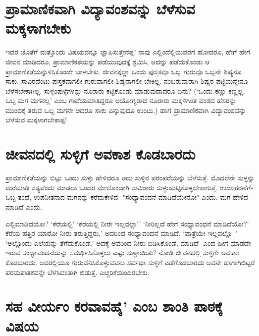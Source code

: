 \section*{ಪ್ರಾಮಾಣಿಕವಾಗಿ ವಿದ್ಯಾವಂಶವನ್ನು ಬೆಳೆಸುವ ಮಕ್ಕಳಾಗಬೇಕು}

ಇದರ ಜೊತೆಗೆ ಮತ್ತೊಂದು ವಿಷಯವನ್ನೂ ಜ್ಞಾಪಿಸುತ್ತೇನೆಪ್ಪ! ನಾವು ಎಲ್ಲಿಂದೆಲ್ಲಿಯವರೆಗೆ ಹೋದರೂ, ಹೇಗೆ ಹೇಗೆ ಜೀವನ ಮಾಡಿದರೂ, ಪ್ರಾಮಾಣಿಕತೆಯನ್ನು ಪಡೆಯುವುದಕ್ಕೆ ಶ್ರಮಿಸಿ, ಅದನ್ನು ಪಡೆದುಕೊಂಡು ಆ ಪ್ರಾಮಾಣಿಕತೆಯನ್ನುಳಿಸಿಕೊಂಡೇ ಬಾಳಬೇಕು. ಜೀವನಕ್ಕೆಲ್ಲಾ ಒಂದು ಪುಸ್ತಕವೂ ಒಬ್ಬ ಗುರುವೂ ಒಬ್ಬನೇ ಶಿಷ್ಯನೂ ಸಾಕು. ಸಾವಿರದೆಂಟು ಪುಸ್ತಕವಾಗಲೀ ಗುರುವಾಗಲೀ ಶಿಷ್ಯನಾಗಲೀ ಬೇಕಿಲ್ಲ. ನಂಬರುವಾರಾಗಿ ಶಿಷ್ಯರ ಪಟ್ಟಿಯನ್ನೇನೂ ಬೆಳೆಸಬೇಕಾಗಿಲ್ಲ. ಸುಳ್ಳಂಪುಳ್ಳೆಗಳನ್ನು ನೂರಾರು ಕಟ್ಟಿಕೊಂಡು ಮಾಡುವುದಾದರೂ ಏನು? (`ಒಂದು ಕಣ್ಣು ಕಣ್ಣಲ್ಲ, ಒಬ್ಬ ಮಗ ಮಗನಲ್ಲ' ಎಂಬ ಗಾದೆಯಮಾತಿದ್ದರೂ ಅಯೋಗ್ಯರಾದ ನೂರಾರು ಮಕ್ಕಳಿಗಿಂತ ವಂಶದ ಹೆಸರನ್ನು ಮುಂದಕ್ಕೆ ತರುವ ಒಬ್ಬ ಮಗನೇ ಆದರೂ ಸಾಕು ಎನ್ನುವುದೂ ಉಂಟು.) ಹಾಗೆ ಪ್ರಾಮಾಣಿಕವಾಗಿ ವಿದ್ಯಾವಂಶವನ್ನು ಬೆಳೆಸುವ ಮಕ್ಕಳಾಗಬೇಕಾಪ್ಪ!

\section*{ಜೀವನದಲ್ಲಿ ಸುಳ್ಳಿಗೆ ಅವಕಾಶ ಕೊಡಬಾರದು}

ಪ್ರಾಮಾಣಿಕತೆಯನ್ನು ಬಿಟ್ಟು ಒಂದು ಸುಳ್ಳು ಹೇಳಿದರೂ ಅದು ಸುಳ್ಳಿನ ಪರಂಪರೆಯನ್ನು ಬೆಳೆಸುತ್ತೆ. ಮೊದಲೆನೇ ಸುಳ್ಳನ್ನು ಮರೆಮಾಡಿ ಸತ್ಯವೆಂದು ಮಾಡಲು ಒಂದರ ಮೇಲೊಂದಾಗಿ ಸಾವಿರಾರು ಸುಳ್ಳುಹುಟ್ಟಿಕೊಳ್ಳಬೇಕಾಗುತ್ತೆ. ಉದಾಹರಣೆಗೆ- ಒಬ್ಬ ತಂದೆ, ಉಪನೀತನಾದ ಮಗನನ್ನು ಕರೆದುಕೇಳಿದ- "ಸಂಧ್ಯಾವಂದನೆ ಮಾಡಿದೆಯೇನೋ" ಎಂದು. ಮಗ ಹೇಳಿದ- ಮಾಡಿದೆ ಎಂದು. 

ಎಲ್ಲಿಮಾಡಿದೆಯೋ? `ಕೆರೆಯಲ್ಲಿ' `ಕೆರೆಯಲ್ಲಿ ನೀರೇ ಇಲ್ಲವಲ್ಲಾ!' `ನೀರಿಲ್ಲದೆ ಹೇಗೆ ಸಂಧ್ಯಾವಂಧನೆ ಮಾಡಿದೆಯೋ?' ಕೆರೆಯ ಹತ್ತಿರ ಯಾರೋ ನೀರು ತರುತ್ತಿದ್ದರು,' ಅದರಿಂದ ಸಂಧ್ಯಾವಂದನೆ ಮಾಡಿದೆ. `ಪಾತ್ರೆಯೇ ಇಲ್ಲವಲ್ಲೊ~' `ಅಲ್ಲೊಂದು ಎಲೆಯನ್ನು ತೆಗೆದುಕೊಂಡೆ,' ಅದಕ್ಕೆ ಅವರಿಂದ ನೀರು ಬಿಡಿಸಿಕೊಂಡೆ, ಮಾಡಿದೆ- ಎಂದ ಹೀಗೆ ಮಾಡದೇ ಇರುವ ಸಂಧ್ಯಾವಂದನೆಯನ್ನು ಸಮರ್ಥಿಸಿಕೊಳ್ಳಲು ಎಷ್ಟು ಸುಳ್ಳಾಯಿತು? ನೋಡಿ ಜೀವನದಲ್ಲಿ ಸುಳ್ಳಿಗೇ ಅವಕಾಶ ಕೊಡಬಾರದು. ಅದರಲ್ಲಿಯೂ ಗುರುವೆನಿಸಿಕೊಳ್ಳುವವನು ಸರ್ವಥಾ ಸುಳ್ಳಿಗೆ ಎಡೆಗೊಡಬಾರದು ಅವನೇ ಹಾಗಾಗಿಬಿಟ್ಟರೆ ಪರಮಪಾತಕವನ್ನೇ ಬೆಳೆಸಿದಂತಾಗಿ ಬಿಡುತ್ತೆ. ಎಚ್ಚರಿಕೆಯಿಂದಿರಬೇಕು.

\section*{ಸಹ ವೀರ್ಯಂ ಕರವಾವಹೈ' ಎಂಬ ಶಾಂತಿ ಪಾಠಕ್ಕೆ ವಿಷಯ}

